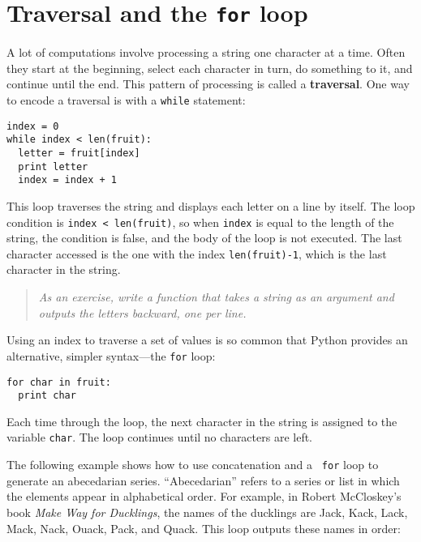 

\section{Traversal and the {\tt for} loop}
\label{for}

A lot of computations involve processing a string one character at a
time.  Often they start at the beginning, select each character in
turn, do something to it, and continue until the end.  This pattern of
processing is called a {\bf traversal}.  One way to encode a traversal
is with a {\tt while} statement:

\beforeverb
\begin{verbatim}
index = 0
while index < len(fruit):
  letter = fruit[index]
  print letter
  index = index + 1
\end{verbatim}
\afterverb
%
This loop traverses the string and displays each letter on a line by
itself.  The loop condition is {\tt index < len(fruit)}, so
when {\tt index} is equal to the length of the string, the
condition is false, and the body of the loop is not executed.  The
last character accessed is the one with the index {\tt len(fruit)-1},
which is the last character in the string.

\begin{quote}
{\em As an exercise, write a function that takes a string as an argument
and outputs the letters backward, one per line.}
\end{quote}

Using an index to
traverse a set of values is so common that
Python provides an alternative, simpler syntax---the {\tt for} loop:

\beforeverb
\begin{verbatim}
for char in fruit:
  print char
\end{verbatim}
\afterverb
%
Each time through the loop, the next character in the string is assigned
to the variable {\tt char}.  The loop continues until no characters are
left.


The following example shows how to use concatenation and a {\tt
for} loop to generate an abecedarian series.  ``Abecedarian'' refers
to a series or list in which the elements appear in alphabetical
order.  For example, in Robert McCloskey's book {\em Make Way for
Ducklings}, the names of the ducklings are Jack, Kack, Lack, Mack,
Nack, Ouack, Pack, and Quack.  This loop outputs these names in order:

